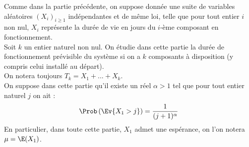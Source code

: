 \documentclass[11pt]{article}%
\begin{document}
\noindent 
Comme dans la partie précédente, on suppose donnée une suite de
variables aléatoires $(X_{i})_{i \geq 1}$ indépendantes et de même
loi, telle que pour tout entier $i$ non nul, $X_{i}$ représente la
durée de vie en jours du $i$-ème composant en fonctionnement.\\
Soit $k$ un entier naturel non nul. On étudie dans cette partie la
durée de fonctionnement prévisible du système si on a $k$ composants à
disposition (y compris celui installé au départ). \\
On notera toujours $T_{k} = X_{1} +... + X_{k}$.\\
On suppose dans cette partie qu'il existe un réel $\alpha >1$ tel que
pour tout entier naturel $j$ on ait :
\[
\Prob\left(\Ev{X_{1} >j}\right) = \frac{1}{(j + 1)^{\alpha}}
\]
En particulier, dans toute cette partie, $X_{1}$ admet une espérance,
on l'on notera $\mu = \E(X_{1})$.
\end{document}
